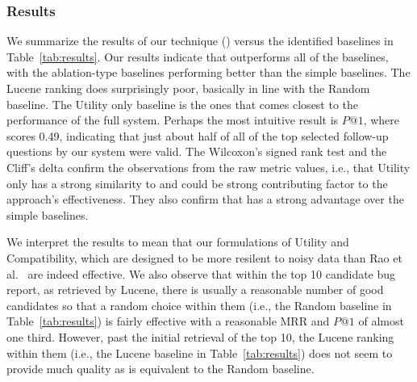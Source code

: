 \subsubsection{Results}
We summarize the results of our technique (\evpi) versus the identified
baselines in Table~\ref{tab:results}. Our results indicate that \evpi outperforms all of the baselines,
with the ablation-type baselines performing better than the simple baselines. The Lucene ranking
does surprisingly poor, basically in line with the Random baseline. The Utility only baseline is
the ones that comes closest to the performance of the full system. Perhaps the most intuitive result
is $P@1$, where \evpi scores 0.49, indicating that just about half of all of the top selected follow-up
questions by our system were valid. The Wilcoxon's signed rank test and the Cliff's delta confirm the observations from
the raw metric values, i.e., that Utility only has a strong similarity to \evpi and could be strong contributing
factor to the approach's effectiveness. They also confirm that \evpi has a strong advantage over the simple
baselines.

We interpret the results to mean that our formulations of Utility and Compatibility, which are designed to be more resilent to noisy data than Rao et al.~\cite{rao-daume-iii-2018-learning} are indeed effective. We also observe that within the top 10 candidate bug report, as retrieved by Lucene, there is usually a reasonable number of good candidates so that a random choice within them (i.e., the Random baseline in Table~\ref{tab:results}) is fairly effective with a reasonable MRR and $P@1$ of almost one third. However, past the initial retrieval of the top 10, the Lucene ranking within them (i.e., the Lucene baseline in Table~\ref{tab:results}) does not seem to provide much quality as is equivalent to the Random baseline.   

